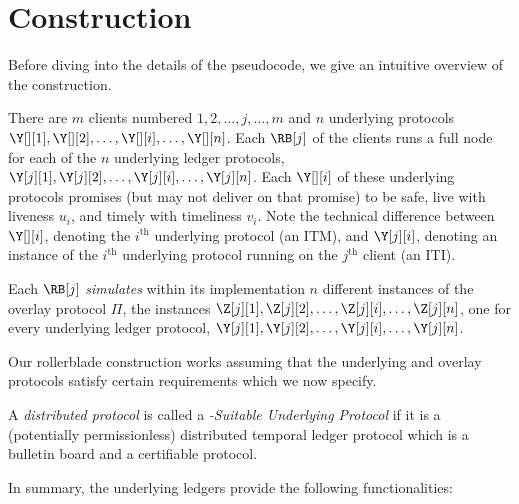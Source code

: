\section{Construction}\label{sec:construction}

Before diving into the details of the pseudocode, we give an intuitive overview
of the \rollerblade construction.


There are $m$ \rollerblade clients numbered $1, 2,\allowbreak \ldots,\allowbreak j,\allowbreak \ldots,\allowbreak m$
and $n$ underlying protocols $\Y[][1], \Y[][2],\allowbreak \ldots,\allowbreak \Y[][i],\allowbreak \ldots,\allowbreak \Y[][n]$.
Each $\RB[j]$ of the clients runs a full node for each of the $n$ underlying
ledger protocols,
$\Y[j][1], \Y[j][2],\allowbreak\ldots,\allowbreak \Y[j][i],\allowbreak \ldots,\allowbreak \Y[j][n]$.
Each $\Y[][i]$ of these underlying protocols promises (but may not deliver on that promise)
to be safe, live with liveness $u_i$, and timely with timeliness $v_i$.
Note the technical difference between $\Y[][i]$, denoting the $i^\text{th}$ underlying protocol (an ITM),
and $\Y[j][i]$, denoting an instance of the $i^\text{th}$ underlying protocol running on the
$j^\text{th}$ client (an ITI).

Each $\RB[j]$ \emph{simulates} within its implementation $n$ different instances
of the overlay protocol $\Pi$, the instances
$\Z[j][1], \Z[j][2],\allowbreak \ldots,\allowbreak \Z[j][i],\allowbreak \ldots,\allowbreak \Z[j][n]$,
one for every underlying ledger protocol,
$\Y[j][1], \Y[j][2],\allowbreak \ldots,\allowbreak \Y[j][i],\allowbreak \ldots,\allowbreak \Y[j][n]$.

Our rollerblade construction works assuming that the underlying and overlay protocols satisfy
certain requirements which we now specify.

\begin{definition}
  A \emph{distributed protocol} is called a \emph{\rollerblade-Suitable
  Underlying Protocol} if it is a
  (potentially permissionless)
  distributed temporal ledger protocol
  which is a bulletin board and a
  certifiable protocol.
\end{definition}

In summary, the underlying ledgers provide the following functionalities:

